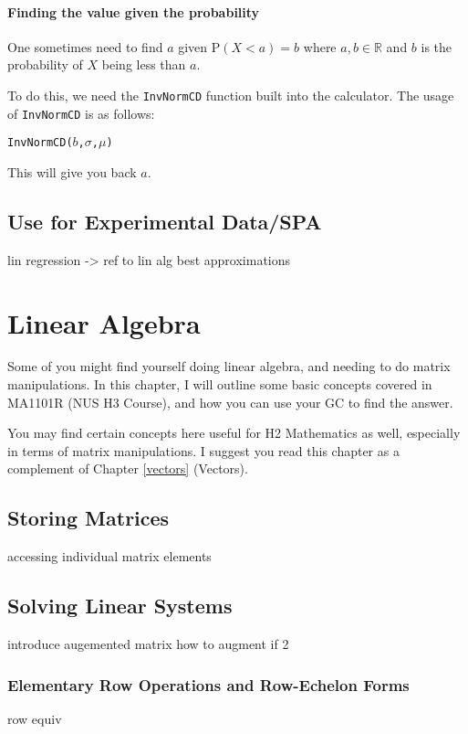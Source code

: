 \documentclass[a5paper]{memoir}
\def\code#1{\texttt{#1}}
\newcommand{\addtoindex}[1]{#1\index{#1}}
\begin{document}
\subsubsection{Finding the value given the probability}
One sometimes need to find $a$ given $\textrm{P}(X < a) = b$ where $a,b \in \mathbb{R}$ and $b$ is the probability of $X$ being less than $a$. 

To do this, we need the \code{\addtoindex{InvNormCD}} function built into the calculator. The usage of \code{InvNormCD} is as follows:
\begin{center}
	\code{InvNormCD($b$,$\sigma$,$\mu$)}
\end{center}

This will give you back $a$.

\section{Use for Experimental Data/SPA}
lin regression -> ref to lin alg best approximations

\chapter{Linear Algebra}
Some of you might find yourself doing linear algebra, and needing to do matrix manipulations. In this chapter, I will outline some basic concepts covered in MA1101R (NUS H3 Course), and how you can use your GC to find the answer.

You may find certain concepts here useful for H2 Mathematics as well, especially in terms of matrix manipulations. I suggest you read this chapter as a complement of Chapter \ref{vectors} (Vectors). 

\section{Storing Matrices}
accessing individual matrix elements

\section{Solving Linear Systems}
introduce augemented matrix
how to augment if 2

\subsection{Elementary Row Operations and Row-Echelon Forms}
row equiv

\printindex
\end{document}
